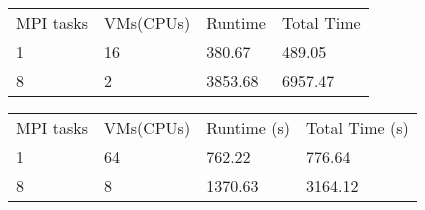 \begin{table}[]
\begin{tabular}{llll}
MPI tasks & VMs(CPUs) & Runtime & Total Time \\
1         & 16        & 380.67  & 489.05     \\
8         & 2         & 3853.68 & 6957.47   
\end{tabular}
\end{table}


\begin{table}[]
\begin{tabular}{llll}
MPI tasks & VMs(CPUs) & Runtime (s) & Total Time (s) \\
1         & 64        & 762.22      & 776.64         \\
8         & 8         & 1370.63     & 3164.12       
\end{tabular}
\end{table}